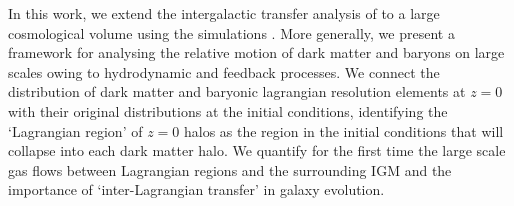 In this work, we extend the intergalactic transfer analysis of
\citet{AnglesAlcazar2017} to a large cosmological volume using the \simba{}
simulations \citep{Dave2018}. More generally, we present a framework for
analysing the relative motion of dark matter and baryons on large scales
owing to hydrodynamic and feedback processes. We connect the distribution of
dark matter and baryonic lagrangian resolution elements at $z=0$ with their
original distributions at the initial conditions, identifying the `Lagrangian
region' of $z=0$ halos as the region in the initial conditions that will
collapse into each dark matter halo. We quantify for the first time the large
scale gas flows between Lagrangian regions and the surrounding IGM and the
importance of `inter-Lagrangian transfer' in galaxy evolution.